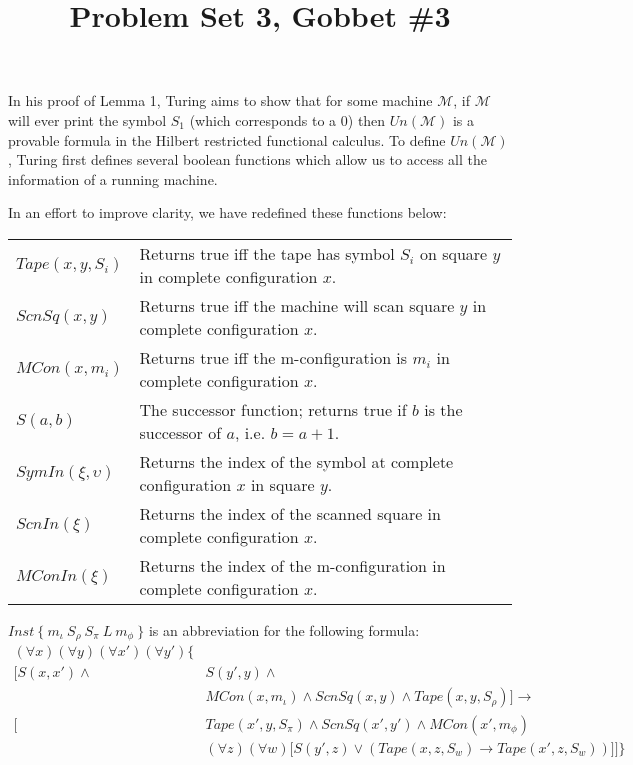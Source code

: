 \documentclass[11pt]{article}
\title{\textbf{Problem Set 3, Gobbet \#3}}
\author{}
\date{}
\newcommand{\?}{\stackrel{?}{=}}
\begin{document}
\maketitle

In his proof of Lemma 1, Turing aims to show that for some machine $\mathscr{M}$, if $\mathscr{M}$ will ever print the symbol $S_1$ (which corresponds to a 0) then $Un(\mathscr{M})$ is a provable formula in the Hilbert restricted functional calculus. To define $Un(\mathscr{M})$, Turing first defines several boolean functions which allow us to access all the information of a running machine.

In an effort to improve clarity, we have redefined these functions below:

\vspace{1cm}
{\renewcommand{\arraystretch}{2}
\begin{tabular}{p{3cm} p{8cm}}
$Tape(x, y, S_i)$ & Returns true iff the tape has symbol $S_i$ on square $y$ in complete configuration $x$. \\ 
$ScnSq(x, y)$ & Returns true iff the machine will scan square $y$ in complete configuration $x$. \\ 
$MCon(x, m_i)$ & Returns true iff the m-configuration is $m_i$ in complete configuration $x$.\\ 
$S(a, b)$ & The successor function; returns true if $b$ is the successor of $a$, i.e. $b = a + 1$. \\
$SymIn(\xi,\upsilon)$ & Returns the index of the symbol at complete configuration $x$ in square $y$. \\
$ScnIn(\xi)$ & Returns the index of the scanned square in complete configuration $x$. \\
$MConIn(\xi)$ & Returns the index of the m-configuration in complete configuration $x$. \\
\end{tabular} 
}
\vspace{1cm}

$Inst \ \{ \ m_\iota \ S_\rho \ S_\pi \ L \ m_\phi \ \}$ is an abbreviation for the following formula:
\begin{align}
(\forall x)(\forall y)(\forall x')(\forall y') \bigg\{ & \\
\Big[ S(x, x') \land & S(y', y) \land  \\
& MCon(x, m_\iota) \land ScnSq(x, y) \land Tape(x, y, S_\rho) \Big] \to \\
\Big[ &Tape(x', y, S_\pi) \land ScnSq(x', y') \land MCon(x', m_\phi) \\
&(\forall z)(\forall w) \big[ S(y',z) \lor (Tape(x,z,S_w) \to Tape(x',z,S_w) ) \big] \Big] \bigg\}
\end{align}
\end{document}
